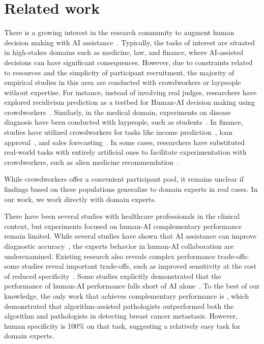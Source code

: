\section{Related work}




There is a growing interest in the research community to augment human decision making with AI assistance~\cite{lai2023towards}. 
Typically, the tasks of interest are situated in high-stakes domains such as medicine, law, and finance, where AI-assisted decisions can have significant consequences. 
However, due to constraints related to resources and the simplicity of participant recruitment, the majority of empirical studies in this area are conducted with crowdworkers or laypeople without expertise.  
For instance, instead of involving real judges, researchers have explored recidivism prediction as a testbed for Human-AI decision making using crowdworkers~\cite{binns2018s, lai2019human, green2019disparate}.
Similarly, in the medical domain, experiments on disease diagnosis have been conducted with laypeople, such as students~\cite{lakkaraju2016interpretable}. 
In finance, studies have utilized crowdworkers for tasks like income prediction~\cite{zhang2020effect}, loan approval~\cite{green2019disparate}, and sales forecasting~\cite{dietvorst2015algorithm}. 
In some cases, researchers have substituted real-world tasks with entirely artificial ones to facilitate experimentation with crowdworkers, such as alien medicine recommendation~\cite{lage2019evaluation}.

While crowdworkers offer a convenient participant pool, it remains unclear if findings based on these populations generalize to domain experts in real cases. In our work, we work directly with domain experts. 


There have been several studies with healthcare professionals in the clinical context, but experiments focused on human-AI complementary performance remain limited.
While several studies have shown that AI assistance can improve diagnostic accuracy~\cite{steiner2018impact,sim2020deep,jain2021development,seah2021effect,mcduff2023towards}, the experts behavior in human-AI collaboration are underexamined.
Existing research also reveals complex performance trade-offs: some studies reveal important trade-offs, such as improved sensitivity at the cost of reduced specificity~\cite{kiani2020impact,park2019deep}.
Some studies explicitly demonstrated that the performance of human-AI performance falls short of AI alone~\cite{rajpurkar2020chexaid,kim2020changes}.
To the best of our knowledge, the only work that achieves complementary performance is \citet{steiner2018impact}, which demonstrated that algorithm-assisted pathologists outperformed both the algorithm and pathologists in detecting breast cancer metastasis. However, human specificity is 100\% on that task, suggesting a relatively easy task for domain experts. 



